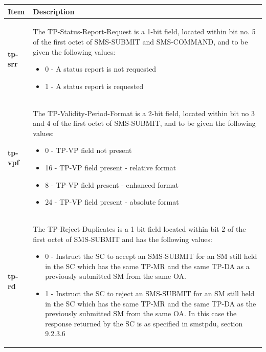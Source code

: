 \documentclass[a4paper,latin]{paper}
\begin{document}
\clearpage
\noindent\begin{tabularx}{\textwidth}{ | l | X |}
	\hline
	Item	 				& Description \\
	\hline
	\textbf{tp-srr}				& The TP-Status-Report-Request is a 1-bit field, located within bit no. 5 of the first octet of SMS-SUBMIT and 
						  SMS-COMMAND, and to be given the following values: 
 	  					  \begin{itemize}
						  	\setlength{\itemsep}{0pt}
							\setlength{\parskip}{0pt}
							\setlength{\parsep}{0pt}
							\item 0 - A status report is not requested  
							\item 1 - A status report is requested 
						    \end{itemize} \\ 
	\textbf{tp-vpf}				& The TP-Validity-Period-Format is a 2-bit field, located within bit no 3 and 4 of the first octet of SMS-SUBMIT, and to 
						  be given the following values: 
 	  					  \begin{itemize}
						  	\setlength{\itemsep}{0pt}
							\setlength{\parskip}{0pt}
							\setlength{\parsep}{0pt}
							\item 0 - TP-VP field not present
							\item 16 - TP-VP field present - relative format
							\item 8 - TP-VP field present - enhanced format
							\item 24 - TP-VP field present - absolute format
						    \end{itemize} \\ 
	\textbf{tp-rd}				& The TP-Reject-Duplicates is a 1 bit field located within bit 2 of the first octet of SMS-SUBMIT and has the following 
						  values:
 	  					  \begin{itemize}
						  	\setlength{\itemsep}{0pt}
							\setlength{\parskip}{0pt}
							\setlength{\parsep}{0pt}
							\item 0 - Instruct the SC to accept an SMS-SUBMIT for an SM still held in the 
								  SC which has the same TP-MR and the same TP-DA as a previously  submitted SM from 
								  the same OA. 
							\item 1 - Instruct the SC to reject an SMS-SUBMIT for an SM still held in the 
								  SC which has the same TP-MR and the same TP-DA as the  previously submitted SM 
								  from the same OA. In this case the response returned by the SC is as specified in \acrfull{smstpdu}, section 9.2.3.6
						    \end{itemize} \\ 

\end{tabularx}
\end{document}
